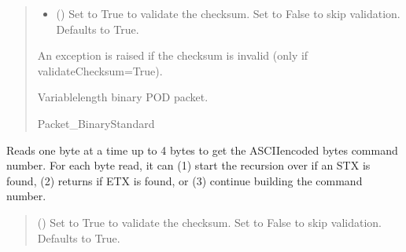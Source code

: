 \documentclass[letterpaper,10pt,english]{sphinxmanual}
\begin{document}
\begin{fulllineitems}
\begin{fulllineitems}
\begin{quote}
\begin{description}
\begin{itemize}
\item {} 
\sphinxAtStartPar
{} (\sphinxstyleliteralemphasis{\sphinxupquote{, }}) \textendash{} Set to True to validate the checksum. Set to False to                 skip validation. Defaults to True.

\end{itemize}

\sphinxAtStartPar
{} \textendash{} An exception is raised if the checksum is invalid (only if validateChecksum=True).

\sphinxAtStartPar
Variable\sphinxhyphen{}length binary POD packet.

\sphinxAtStartPar
Packet\_BinaryStandard

\end{description}\end{quote}

\end{fulllineitems}


\begin{fulllineitems}
\label{\detokenize{PodApi.Devices:PodApi.Devices.BasicPodProtocol.Pod._Read_GetCommand}}
\pysigstartsignatures
{}
\pysigstopsignatures
\sphinxAtStartPar
Reads one byte at a time up to 4 bytes to get the ASCII\sphinxhyphen{}encoded bytes command number. For each         byte read, it can (1) start the recursion over if an STX is found, (2) returns if ETX is found, or         (3) continue building the command number.
\begin{quote}\begin{description}
\sphinxAtStartPar
{} (\sphinxstyleliteralemphasis{\sphinxupquote{, }}) \textendash{} Set to True to validate the checksum. Set to False to skip                 validation. Defaults to True.


\end{description}
\end{quote}
\end{fulllineitems}
\end{fulllineitems}
\end{document}
